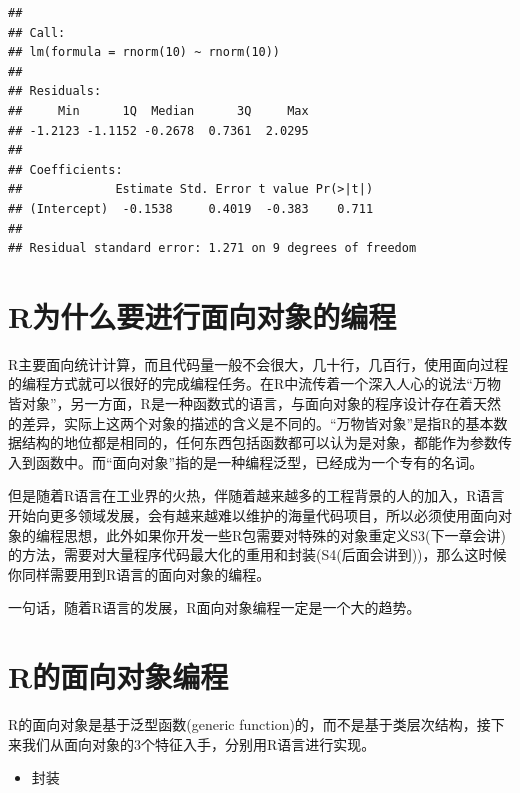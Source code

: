 \documentclass[]{book}
\providecommand{\tightlist}{%
  \setlength{\itemsep}{0pt}\setlength{\parskip}{0pt}}
\begin{document}
\begin{verbatim}
## 
## Call:
## lm(formula = rnorm(10) ~ rnorm(10))
## 
## Residuals:
##     Min      1Q  Median      3Q     Max 
## -1.2123 -1.1152 -0.2678  0.7361  2.0295 
## 
## Coefficients:
##             Estimate Std. Error t value Pr(>|t|)
## (Intercept)  -0.1538     0.4019  -0.383    0.711
## 
## Residual standard error: 1.271 on 9 degrees of freedom
\end{verbatim}

\section{R为什么要进行面向对象的编程}\label{r}

R主要面向统计计算，而且代码量一般不会很大，几十行，几百行，使用面向过程的编程方式就可以很好的完成编程任务。在R中流传着一个深入人心的说法``万物皆对象''，另一方面，R是一种函数式的语言，与面向对象的程序设计存在着天然的差异，实际上这两个对象的描述的含义是不同的。``万物皆对象''是指R的基本数据结构的地位都是相同的，任何东西包括函数都可以认为是对象，都能作为参数传入到函数中。而``面向对象''指的是一种编程泛型，已经成为一个专有的名词。

但是随着R语言在工业界的火热，伴随着越来越多的工程背景的人的加入，R语言开始向更多领域发展，会有越来越难以维护的海量代码项目，所以必须使用面向对象的编程思想，此外如果你开发一些R包需要对特殊的对象重定义S3(下一章会讲)的方法，需要对大量程序代码最大化的重用和封装(S4(后面会讲到))，那么这时候你同样需要用到R语言的面向对象的编程。

一句话，随着R语言的发展，R面向对象编程一定是一个大的趋势。

\section{R的面向对象编程}\label{r}

R的面向对象是基于泛型函数(generic
function)的，而不是基于类层次结构，接下来我们从面向对象的3个特征入手，分别用R语言进行实现。

\begin{itemize}
\tightlist
\item
  封装
\end{itemize}
\end{document}
